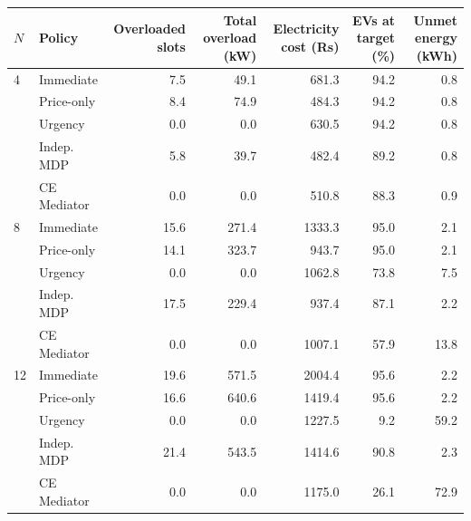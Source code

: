 \begin{tabular}{llrrrrr}
\toprule
$N$ & Policy & Overloaded slots & Total overload (kW) & Electricity cost (Rs) & EVs at target (\%) & Unmet energy (kWh) \\
\midrule
4 & Immediate & 7.5 & 49.1 & 681.3 & 94.2 & 0.8 \\
 & Price-only & 8.4 & 74.9 & 484.3 & 94.2 & 0.8 \\
 & Urgency & 0.0 & 0.0 & 630.5 & 94.2 & 0.8 \\
 & Indep. MDP & 5.8 & 39.7 & 482.4 & 89.2 & 0.8 \\
 & CE Mediator & 0.0 & 0.0 & 510.8 & 88.3 & 0.9 \\
\midrule
8 & Immediate & 15.6 & 271.4 & 1333.3 & 95.0 & 2.1 \\
 & Price-only & 14.1 & 323.7 & 943.7 & 95.0 & 2.1 \\
 & Urgency & 0.0 & 0.0 & 1062.8 & 73.8 & 7.5 \\
 & Indep. MDP & 17.5 & 229.4 & 937.4 & 87.1 & 2.2 \\
 & CE Mediator & 0.0 & 0.0 & 1007.1 & 57.9 & 13.8 \\
\midrule
12 & Immediate & 19.6 & 571.5 & 2004.4 & 95.6 & 2.2 \\
 & Price-only & 16.6 & 640.6 & 1419.4 & 95.6 & 2.2 \\
 & Urgency & 0.0 & 0.0 & 1227.5 & 9.2 & 59.2 \\
 & Indep. MDP & 21.4 & 543.5 & 1414.6 & 90.8 & 2.3 \\
 & CE Mediator & 0.0 & 0.0 & 1175.0 & 26.1 & 72.9 \\
\bottomrule
\end{tabular}
